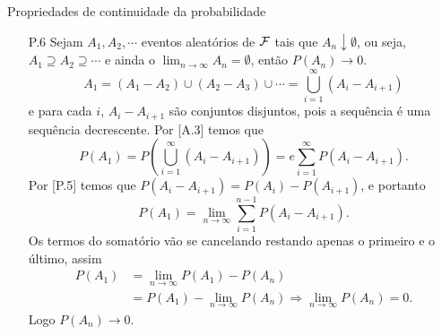 \begin{frame}{Propriedades de continuidade da probabilidade}
 \begin{enumerate}

\item[P.6] Sejam $ A_1,A_2, \cdots $ eventos aleatórios de ${\cal F}$ tais que $ A_n \downarrow \emptyset $, ou seja, $ A_1 \supseteq A_2 \supseteq \cdots $ e ainda o $ \displaystyle \lim_{n\rightarrow \infty}A_n=\emptyset $, então $ P(A_n)\rightarrow 0.$ 
$$A_1=(A_1- A_2)\cup (A_2 - A_3)\cup \cdots =  \bigcup_{i=1}^{\infty}(A_i- A_{i+1})$$ 	e  para cada $i$, $ A_i-  A_{i+1} $ são conjuntos disjuntos, pois a sequência é uma sequência decrescente. Por [A.3] temos  que $$P(A_1)=P\left(\bigcup_{i=1}^{\infty}(A_i- A_{i+1})\right)=e\sum_{i=1}^{\infty}P(A_i - A_{i+1}).$$ Por [P.5] temos que $ P(A_i- A_{i+1})=P(A_i)-P(A_{i+1}) $, e portanto 
$$P(A_1)=\displaystyle \lim_{n \rightarrow \infty} \displaystyle\sum _{i=1}^{n-1}P(A_i-  A_{i+1}).$$ 	Os termos do somatório vão se cancelando restando apenas o primeiro e o último, assim 
$$
\begin{aligned}
P(A_1) & = \displaystyle \lim_{n \rightarrow \infty} P(A_1) - P(A_n)  \\ &=P(A_1) - \lim_{n \rightarrow \infty} P(A_n) \Rightarrow \lim_{n \rightarrow \infty}P(A_n)=0.
\end{aligned}
$$ 	 
Logo  $ P(A_n)\rightarrow 0 $.
\end{enumerate}
\end{frame}

